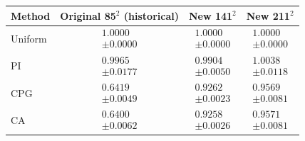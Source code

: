\begin{tabular}{lccc}
\toprule
Method & Original 85$^2$ (historical) & New 141$^2$ & New 211$^2$ \\
\midrule
Uniform & $\begin{gathered}1.0000\\[-2pt]\pm 0.0000\end{gathered}$ & $\begin{gathered}1.0000\\[-2pt]\pm 0.0000\end{gathered}$ & $\begin{gathered}1.0000\\[-2pt]\pm 0.0000\end{gathered}$ \\
PI & $\begin{gathered}0.9965\\[-2pt]\pm 0.0177\end{gathered}$ & $\begin{gathered}0.9904\\[-2pt]\pm 0.0050\end{gathered}$ & $\begin{gathered}1.0038\\[-2pt]\pm 0.0118\end{gathered}$ \\
CPG & $\begin{gathered}0.6419\\[-2pt]\pm 0.0049\end{gathered}$ & $\begin{gathered}0.9262\\[-2pt]\pm 0.0023\end{gathered}$ & $\begin{gathered}0.9569\\[-2pt]\pm 0.0081\end{gathered}$ \\
CA & $\begin{gathered}0.6400\\[-2pt]\pm 0.0062\end{gathered}$ & $\begin{gathered}0.9258\\[-2pt]\pm 0.0026\end{gathered}$ & $\begin{gathered}0.9571\\[-2pt]\pm 0.0081\end{gathered}$ \\
\bottomrule
\end{tabular}
